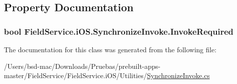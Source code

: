 \subsection{Property Documentation}
\hypertarget{class_field_service_1_1i_o_s_1_1_synchronize_invoke_aa4a7dffc956118db80b131031c8bcfb8}{
\subsubsection[{Invoke\+Required}]{\setlength{\rightskip}{0pt plus 5cm}bool Field\+Service.\+i\+O\+S.\+Synchronize\+Invoke.\+Invoke\+Required\hspace{0.3cm}{\ttfamily [get]}}}\label{class_field_service_1_1i_o_s_1_1_synchronize_invoke_aa4a7dffc956118db80b131031c8bcfb8}


The documentation for this class was generated from the following file\+:\begin{DoxyCompactItemize}
\item 
/\+Users/bsd-\/mac/\+Downloads/\+Pruebas/prebuilt-\/apps-\/master/\+Field\+Service/\+Field\+Service.\+i\+O\+S/\+Utilities/\hyperlink{_field_service_8i_o_s_2_utilities_2_synchronize_invoke_8cs}{Synchronize\+Invoke.\+cs}\end{DoxyCompactItemize}
